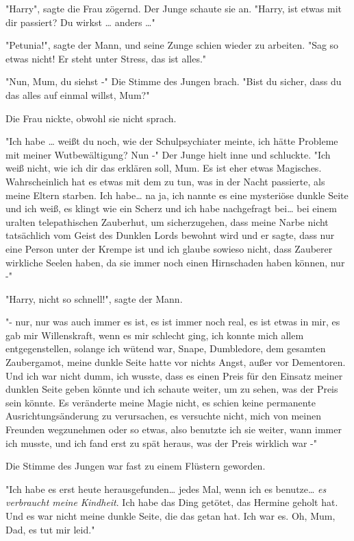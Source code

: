 {"Harry", sagte die Frau zögernd. Der Junge schaute sie an. "Harry, ist etwas mit dir passiert? Du wirkst … anders …"

"Petunia!", sagte der Mann, und seine Zunge schien wieder zu arbeiten. "Sag so etwas nicht! Er steht unter Stress, das ist alles."

"Nun, Mum, du siehst -" Die Stimme des Jungen brach. "Bist du sicher, dass du das alles auf einmal willst, Mum?"

Die Frau nickte, obwohl sie nicht sprach.

"Ich habe … weißt du noch, wie der Schulpsychiater meinte, ich hätte Probleme mit meiner Wutbewältigung? Nun -" Der Junge hielt inne und schluckte. "Ich weiß nicht, wie ich dir das erklären soll, Mum. Es ist eher etwas Magisches. Wahrscheinlich hat es etwas mit dem zu tun, was in der Nacht passierte, als meine Eltern starben. Ich habe… na ja, ich nannte es eine mysteriöse dunkle Seite und ich weiß, es klingt wie ein Scherz und ich habe nachgefragt bei… bei einem uralten telepathischen Zauberhut, um sicherzugehen, dass meine Narbe nicht tatsächlich vom Geist des Dunklen Lords bewohnt wird und er sagte, dass nur eine Person unter der Krempe ist und ich glaube sowieso nicht, dass Zauberer wirkliche Seelen haben, da sie immer noch einen Hirnschaden haben können, nur -"

"Harry, nicht so schnell!", sagte der Mann.

"- nur, nur was auch immer es ist, es ist immer noch real, es ist etwas in mir, es gab mir Willenskraft, wenn es mir schlecht ging, ich konnte mich allem entgegenstellen, solange ich wütend war, Snape, Dumbledore, dem gesamten Zaubergamot, meine dunkle Seite hatte vor nichts Angst, außer vor Dementoren. Und ich war nicht dumm, ich wusste, dass es einen Preis für den Einsatz meiner dunklen Seite geben könnte und ich schaute weiter, um zu sehen, was der Preis sein könnte. Es veränderte meine Magie nicht, es schien keine permanente Ausrichtungsänderung zu verursachen, es versuchte nicht, mich von meinen Freunden wegzunehmen oder so etwas, also benutzte ich sie weiter, wann immer ich musste, und ich fand erst zu spät heraus, was der Preis wirklich war -"

Die Stimme des Jungen war fast zu einem Flüstern geworden.

"Ich habe es erst heute herausgefunden… jedes Mal, wenn ich es benutze… \emph{es verbraucht meine Kindheit}. Ich habe das Ding getötet, das Hermine geholt hat. Und es war nicht meine dunkle Seite, die das getan hat. Ich war es. Oh, Mum, Dad, es tut mir leid."

}
